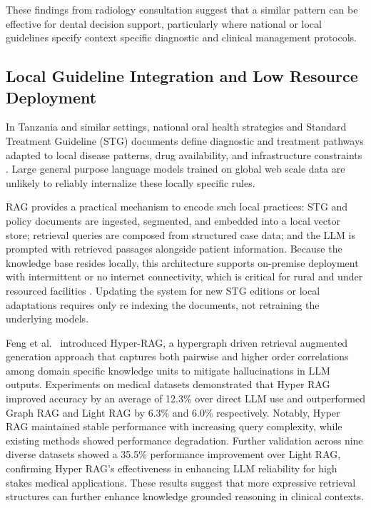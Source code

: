 \documentclass[12pt,a4paper]{report}
\begin{document}
	These findings from radiology consultation suggest that a similar pattern can be
	effective for dental decision support, particularly where national or local
	guidelines specify context specific diagnostic and clinical management protocols.
	
	\subsection{Local Guideline Integration and Low Resource Deployment}
	
	In Tanzania and similar settings, national oral health strategies and Standard
	Treatment Guideline (STG) documents define diagnostic and treatment pathways
	adapted to local disease patterns, drug availability, and infrastructure
	constraints \cite{Edward2024OralHealthTZ,tanzania_oral_health_policy}. Large
	general purpose language models trained on global web scale data are unlikely to
	reliably internalize these locally specific rules.
	
	RAG provides a practical mechanism to encode such local practices: STG and
	policy documents are ingested, segmented, and embedded into a local vector
	store; retrieval queries are composed from structured case data; and the LLM is
	prompted with retrieved passages alongside patient information. Because the
	knowledge base resides locally, this architecture supports on-premise
	deployment with intermittent or no internet connectivity, which is critical for
	rural and under resourced facilities \cite{Edward2024OralHealthTZ}. Updating the
	system for new STG editions or local adaptations requires only re indexing the
	documents, not retraining the underlying models.
	
	Feng et al.~\cite{feng2025hyper_rag} introduced Hyper-RAG, a hypergraph driven retrieval augmented generation approach that captures both pairwise and higher order correlations among domain specific knowledge units to mitigate hallucinations in LLM outputs. Experiments on medical datasets demonstrated that Hyper RAG improved accuracy by an average of 12.3\% over direct LLM use and outperformed Graph RAG and Light RAG by 6.3\% and 6.0\% respectively. Notably, Hyper RAG maintained stable performance with increasing query complexity, while existing methods showed performance degradation. Further validation across nine diverse datasets showed a 35.5\% performance improvement over Light RAG, confirming Hyper RAG's effectiveness in enhancing LLM reliability for high stakes medical applications. These results suggest that more expressive retrieval structures can further enhance knowledge grounded reasoning in clinical contexts.
	
\end{document}
